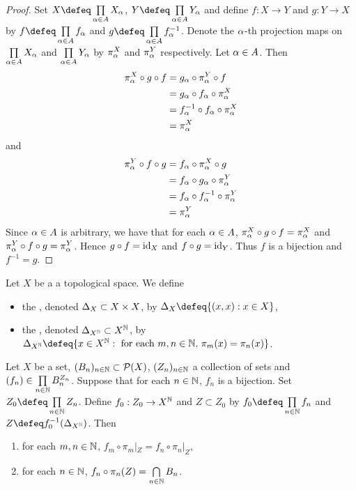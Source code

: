 \documentclass{book}
\begin{document}
	\begin{proof}
		Set $X \defeq \prod\limits_{\al \in A} X_{\al}$, $Y \defeq \prod\limits_{\al \in A}Y_{\al}$ and define $f: X \rightarrow Y$ and $g: Y \rightarrow X$ by $f \defeq \prod\limits_{\al \in A} f_{\al}$ and $g \defeq \prod\limits_{\al \in A} f_{\al}^{-1}$. Denote the $\alpha$-th projection maps on $\prod\limits_{\alpha \in A} X_{\alpha}$ and $\prod\limits_{\alpha \in A} Y_{\alpha}$ by $\pi^X_{\alpha}$ and $\pi^Y_{\alpha}$ respectively. Let $\alpha \in A$. Then
		\begin{align*}
			\pi_{\alpha}^X \circ g \circ f
			& = g_{\alpha} \circ \pi_{\alpha}^Y \circ f \\
			& = g_{\alpha} \circ f_{\alpha} \circ \pi_{\alpha}^X \\
			& = f_{\alpha}^{-1} \circ f_{\alpha} \circ \pi_{\alpha}^X \\
			& = \pi_{\alpha}^X
		\end{align*}
		and 
		\begin{align*}
			\pi_{\alpha}^Y \circ f \circ g
			& = f_{\alpha} \circ \pi_{\alpha}^X \circ g \\
			& = f_{\alpha} \circ g_{\alpha} \circ \pi_{\alpha}^Y \\
			& = f_{\alpha} \circ f_{\alpha}^{-1} \circ \pi_{\alpha}^Y  \\
			& = \pi_{\alpha}^Y 
		\end{align*}
		Since $\alpha \in A$ is arbitrary, we have that for each $\alpha \in A$, $\pi_{\alpha}^X \circ g \circ f = \pi_{\alpha}^X$ and $\pi_{\alpha}^Y \circ f \circ g = \pi_{\alpha}^Y$. Hence $g \circ f = \operatorname{id}_X$ and $f \circ g = \operatorname{id}_Y$. Thus $f$ is a bijection and $f^{-1} = g$. 
	\end{proof}

	\begin{defn} 
		Let $X$ be a a topological space. We define 
		\begin{itemize}
			\item the , denoted $\Delta_X \subset X \times X$, by $\Del_X \defeq \{(x,x):x \in X\}$,
			\item the , denoted $\Delta_{X^{\mathbb{N}}} \subset X^{\mathbb{N}}$, by $\Del_{X^{\N}} \defeq \{x \in X^{\N}: \text{ for each $m,n \in \N$, $\pi_m(x) = \pi_n(x)$}\}$.
		\end{itemize}
	\end{defn}

	\begin{ex} 
		Let $X$ be a set, $(B_n)_{n \in \mathbb{N}} \subset \mathcal{P}(X)$, $(Z_n)_{n \in \mathbb{N}}$ a collection of sets and $(f_n) \in \prod\limits_{n \in \mathbb{N}} B_n^{Z_n}$. Suppose that for each $n \in \mathbb{N}$, $f_n$ is a bijection. Set $Z_0 \defeq \prod\limits_{n \in \N} Z_n$. Define $f_0: Z_0 \rightarrow X^{\mathbb{N}}$ and $Z \subset Z_0$ by $f_0 \defeq \prod\limits_{n \in \N} f_n$ and $Z \defeq f_0^{-1}(\Del_{X^{\N}})$. Then 
		\begin{enumerate}
			\item for each $m,n \in \mathbb{N}$, $f_m \circ \pi_m|_Z = f_n \circ \pi_n|_Z$,
			\item for each $n \in \mathbb{N}$, $f_n \circ \pi_n(Z) = \bigcap\limits_{n \in \mathbb{N}} B_n$.
		\end{enumerate}
	\end{ex}
	
\end{document}
